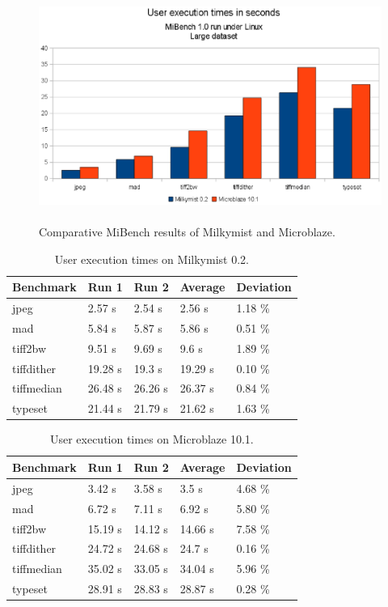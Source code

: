 \documentclass[a4paper,11pt]{kthesis}
\begin{document}
\begin{figure}[htp]
\centering
\includegraphics[height=75mm]{mm_vs_mb.eps}
\caption{Comparative MiBench results of Milkymist and Microblaze.}
\label{fig:mmvsmb}
\end{figure}

\begin{table}
\centering
\begin{tabular}{|l|l|l|l|l|}
\hline
\textbf{Benchmark} & \textbf{Run 1} & \textbf{Run 2} & \textbf{Average} & \textbf{Deviation}  \\
\hline
jpeg & 2.57 s & 2.54 s & 2.56 s & 1.18 \% \\
\hline
mad & 5.84 s & 5.87 s & 5.86 s & 0.51 \% \\
\hline
tiff2bw & 9.51 s & 9.69 s & 9.6 s & 1.89 \% \\
\hline
tiffdither & 19.28 s & 19.3 s & 19.29 s & 0.10 \% \\
\hline
tiffmedian & 26.48 s & 26.26 s & 26.37 s & 0.84 \% \\
\hline
typeset & 21.44 s & 21.79 s & 21.62 s & 1.63 \% \\
\hline
\end{tabular}
\label{tab:milkymistspeed}
\caption{User execution times on Milkymist 0.2.}
\end{table}

\begin{table}
\centering
\begin{tabular}{|l|l|l|l|l|}
\hline
\textbf{Benchmark} & \textbf{Run 1} & \textbf{Run 2} & \textbf{Average} & \textbf{Deviation}  \\
\hline
jpeg & 3.42 s & 3.58 s & 3.5 s & 4.68 \% \\
\hline
mad & 6.72 s & 7.11 s & 6.92 s & 5.80 \% \\
\hline
tiff2bw & 15.19 s & 14.12 s & 14.66 s & 7.58 \% \\
\hline
tiffdither & 24.72 s & 24.68 s & 24.7 s & 0.16 \% \\
\hline
tiffmedian & 35.02 s & 33.05 s & 34.04 s & 5.96 \% \\
\hline
typeset & 28.91 s & 28.83 s & 28.87 s & 0.28 \% \\
\hline
\end{tabular}
\label{tab:microblazespeed}
\caption{User execution times on Microblaze 10.1.}
\end{table}
\end{document}
